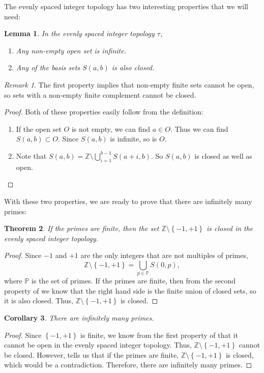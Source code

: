\documentclass[a4paper]{article}
\newtheorem{theorem}{Theorem}[section]
\newtheorem{corollary}[theorem]{Corollary}
\newtheorem{lemma}[theorem]{Lemma}
\theoremstyle{definition}
\theoremstyle{remark}
\newtheorem*{remark}{Remark}
\begin{document}
The evenly spaced integer topology has two interesting properties that we will need:
\begin{lemma}
  In the evenly spaced integer topology $\tau$,
  \begin{enumerate}
    \item Any non-empty open set is infinite.
    \item Any of the basis sets $S(a,b)$ is also closed.
  \end{enumerate}
  \label{lem:2prop}
\end{lemma}
\begin{remark}
  The first property implies that non-empty finite sets cannot be open, so sets with a non-empty finite complement cannot be closed.
  \label{rem:2prop}
\end{remark}
\begin{proof}
  Both of these properties easily follow from the definition:
  \begin{enumerate}
    \item If the open set $O$ is not empty, we can find $a\in O$. Thus we can find $S(a,b)\subset O$. Since $S(a,b)$ is infinite, so is $O$.
    \item Note that $\displaystyle S(a,b)=\mathbb{Z}\setminus \bigcup\limits_{i=1}^{b-1}S(a+i,b)$. So $S(a,b)$ is closed as well as open.
  \end{enumerate}
\end{proof}
With these two properties, we are ready to prove that there are infinitely many primes:
\begin{theorem}
  If the primes are finite, then the set $\mathbb{Z}\setminus\left\{ -1,+1 \right\}$ is closed in the evenly spaced integer topology.
  \label{thm:topPrimes}
\end{theorem}
\begin{proof}
  Since $-1$ and $+1$ are the only integers that are not multiples of primes,
  \[
  \mathbb{Z}\setminus\left\{ -1,+1 \right\}=\bigcup\limits_{p\in\mathbb{P}}S(0,p)
  ,
  \]
  where $\mathbb{P}$ is the set of primes.
  If the primes are finite, then from the second property of  we know that the right hand side is the finite union of closed sets, so it is also closed. Thus, $\mathbb{Z}\setminus\left\{ -1,+1 \right\}$ is closed. 
\end{proof}
\begin{corollary}
  There are infinitely many primes.
  \label{cor:topPrimes}
\end{corollary}
\begin{proof}
  Since $\left\{ -1,+1 \right\}$ is finite, we know from the first property of  that it cannot be open in the evenly spaced integer topology. Thus, $\mathbb{Z}\setminus\left\{ -1,+1 \right\}$ cannot be closed. However,  tells us that if the primes are finite,  $\mathbb{Z}\setminus\left\{ -1,+1 \right\}$ is closed, which would be a contradiction. Therefore, there are infinitely many primes.
\end{proof}
\end{document}
